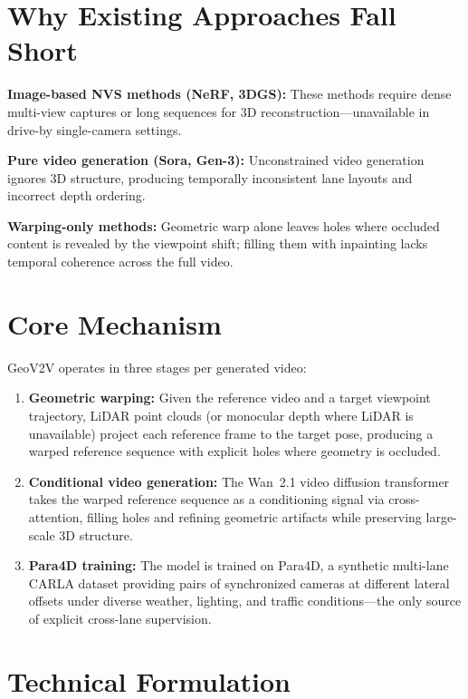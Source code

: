 \documentclass[10pt,twocolumn]{article}
\begin{document}
\section{Why Existing Approaches Fall Short}

\textbf{Image-based NVS methods (NeRF, 3DGS):}
These methods require dense multi-view captures or long sequences for
3D reconstruction---unavailable in drive-by single-camera settings.

\textbf{Pure video generation (Sora, Gen-3):}
Unconstrained video generation ignores 3D structure, producing
temporally inconsistent lane layouts and incorrect depth ordering.

\textbf{Warping-only methods:}
Geometric warp alone leaves holes where occluded content is revealed
by the viewpoint shift; filling them with inpainting lacks temporal
coherence across the full video.

\section{Core Mechanism}

GeoV2V operates in three stages per generated video:

\begin{enumerate}[itemsep=2pt,parsep=0pt]
  \item \textbf{Geometric warping:} Given the reference video and a
    target viewpoint trajectory, LiDAR point clouds (or monocular depth
    where LiDAR is unavailable) project each reference frame to the
    target pose, producing a warped reference sequence with explicit
    holes where geometry is occluded.
  \item \textbf{Conditional video generation:} The Wan~2.1 video
    diffusion transformer takes the warped reference sequence as a
    conditioning signal via cross-attention, filling holes and refining
    geometric artifacts while preserving large-scale 3D structure.
  \item \textbf{Para4D training:} The model is trained on Para4D, a
    synthetic multi-lane CARLA dataset providing pairs of synchronized
    cameras at different lateral offsets under diverse weather, lighting,
    and traffic conditions---the only source of explicit cross-lane
    supervision.
\end{enumerate}

\section{Technical Formulation}
\end{document}
